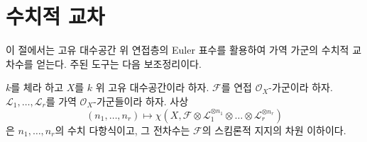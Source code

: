 \section{수치적 교차}
\label{section-num}

\noindent
이 절에서는 고유 대수공간 위 연접층의 Euler 표수를 활용하여 가역 가군의
수치적 교차수를 얻는다. 주된 도구는 다음 보조정리이다.

\begin{lemma}
\label{lemma-numerical-polynomial-from-euler}
$k$를 체라 하고 $X$를 $k$ 위 고유 대수공간이라 하자. $\mathcal{F}$를 연접
$\mathcal{O}_X$-가군이라 하자. $\mathcal{L}_1, \ldots, \mathcal{L}_r$를 가역
$\mathcal{O}_X$-가군들이라 하자. 사상
$$
(n_1, \ldots, n_r) \longmapsto
\chi(X, \mathcal{F} \otimes
\mathcal{L}_1^{\otimes n_1} \otimes \ldots \otimes
\mathcal{L}_r^{\otimes n_r})
$$
은 $n_1, \ldots, n_r$의 수치 다항식이고, 그 전차수는 $\mathcal{F}$의
스킴론적 지지의 차원 이하이다.
\end{lemma}

